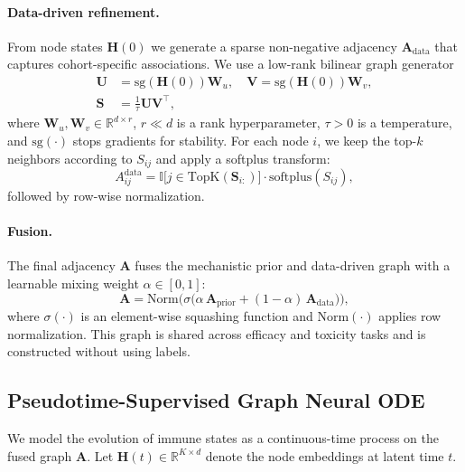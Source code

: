 \documentclass{article}
\begin{document}
\paragraph{Data-driven refinement.}
From node states $\mathbf{H}(0)$ we generate a sparse non-negative adjacency $\mathbf{A}_{\mathrm{data}}$
that captures cohort-specific associations.
We use a low-rank bilinear graph generator
\begin{align}
\mathbf{U} &= \mathrm{sg}(\mathbf{H}(0))\mathbf{W}_u, \quad
\mathbf{V} = \mathrm{sg}(\mathbf{H}(0))\mathbf{W}_v,\\
\mathbf{S} &= \tfrac{1}{\tau}\mathbf{U}\mathbf{V}^\top,
\end{align}
where $\mathbf{W}_u,\mathbf{W}_v\in\mathbb{R}^{d\times r}$, $r\ll d$ is a rank hyperparameter,
$\tau>0$ is a temperature, and $\mathrm{sg}(\cdot)$ stops gradients for stability.
For each node $i$, we keep the top-$k$ neighbors according to $S_{ij}$ and apply a softplus transform:
\begin{equation}
A^{\mathrm{data}}_{ij}=
\mathbb{I}\big[j\in\mathrm{TopK}(\mathbf{S}_{i:})\big]\cdot \mathrm{softplus}(S_{ij}),
\end{equation}
followed by row-wise normalization.

\paragraph{Fusion.}
The final adjacency $\mathbf{A}$ fuses the mechanistic prior and data-driven graph with a learnable mixing weight
$\alpha\in[0,1]$:
\begin{equation}
\mathbf{A}=\mathrm{Norm}\!\big(\sigma\big(\alpha\,\mathbf{A}_{\mathrm{prior}}+(1-\alpha)\,\mathbf{A}_{\mathrm{data}}\big)\big),
\label{eq:fusion}
\end{equation}
where $\sigma(\cdot)$ is an element-wise squashing function and $\mathrm{Norm}(\cdot)$ applies row normalization.
This graph is shared across efficacy and toxicity tasks and is constructed without using labels.



\subsection{Pseudotime-Supervised Graph Neural ODE}
\label{subsec:gnode}

We model the evolution of immune states as a continuous-time process on the fused graph $\mathbf{A}$.
Let $\mathbf{H}(t)\in\mathbb{R}^{K\times d}$ denote the node embeddings at latent time $t$.
\end{document}
